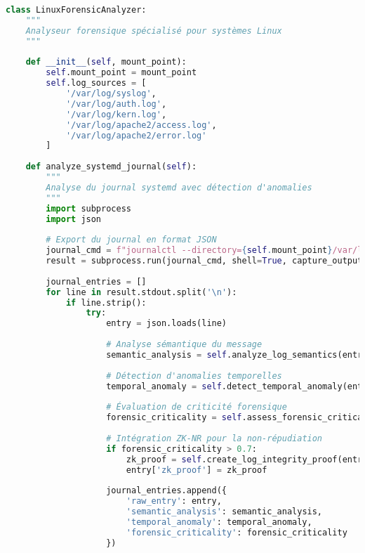 \begin{lstlisting}[language=Python, caption=Analyseur de logs Linux avec détection d'anomalies]
class LinuxForensicAnalyzer:
    """
    Analyseur forensique spécialisé pour systèmes Linux
    """
    
    def __init__(self, mount_point):
        self.mount_point = mount_point
        self.log_sources = [
            '/var/log/syslog',
            '/var/log/auth.log', 
            '/var/log/kern.log',
            '/var/log/apache2/access.log',
            '/var/log/apache2/error.log'
        ]
        
    def analyze_systemd_journal(self):
        """
        Analyse du journal systemd avec détection d'anomalies
        """
        import subprocess
        import json
        
        # Export du journal en format JSON
        journal_cmd = f"journalctl --directory={self.mount_point}/var/log/journal --output=json"
        result = subprocess.run(journal_cmd, shell=True, capture_output=True, text=True)
        
        journal_entries = []
        for line in result.stdout.split('\n'):
            if line.strip():
                try:
                    entry = json.loads(line)
                    
                    # Analyse sémantique du message
                    semantic_analysis = self.analyze_log_semantics(entry['MESSAGE'])
                    
                    # Détection d'anomalies temporelles
                    temporal_anomaly = self.detect_temporal_anomaly(entry['__REALTIME_TIMESTAMP'])
                    
                    # Évaluation de criticité forensique
                    forensic_criticality = self.assess_forensic_criticality(entry)
                    
                    # Intégration ZK-NR pour la non-répudiation
                    if forensic_criticality > 0.7:
                        zk_proof = self.create_log_integrity_proof(entry)
                        entry['zk_proof'] = zk_proof
                    
                    journal_entries.append({
                        'raw_entry': entry,
                        'semantic_analysis': semantic_analysis,
                        'temporal_anomaly': temporal_anomaly,
                        'forensic_criticality': forensic_criticality
                    })
                    

\end{lstlisting}
